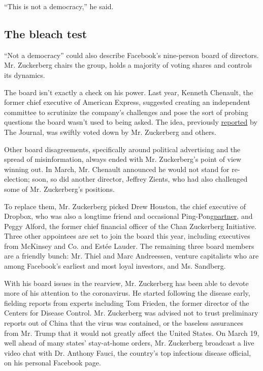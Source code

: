 ``This is not a democracy,'' he said.

\hypertarget{the-bleach-test}{%
\subsection{The bleach test}\label{the-bleach-test}}

``Not a democracy'' could also describe Facebook's nine-person board of
directors. Mr. Zuckerberg chairs the group, holds a majority of voting
shares and controls its dynamics.

The board isn't exactly a check on his power. Last year, Kenneth
Chenault, the former chief executive of American Express, suggested
creating an independent committee to scrutinize the company's challenges
and pose the sort of probing questions the board wasn't used to being
asked. The idea, previously
\href{https://www.wsj.com/articles/mark-zuckerberg-asserts-control-of-facebook-pushing-aside-dissenters-11588106984}{reported}
by The Journal, was swiftly voted down by Mr. Zuckerberg and others.

Other board disagreements, specifically around political advertising and
the spread of misinformation, always ended with Mr. Zuckerberg's point
of view winning out. In March, Mr. Chenault announced he would not stand
for re-election; soon, so did another director, Jeffrey Zients, who had
also challenged some of Mr. Zuckerberg's positions.

To replace them, Mr. Zuckerberg picked Drew Houston, the chief executive
of Dropbox, who was also a longtime friend and occasional
Ping-Pong\href{https://www.usatoday.com/story/tech/talkingtech/2017/03/09/ping-pong-night-out-tech-ceos-zuckerberg-houston-and-kalanick/98985578/}{partner},
and Peggy Alford, the former chief financial officer of the Chan
Zuckerberg Initiative. Three other appointees are set to join the board
this year, including executives from McKinsey and Co. and Estée Lauder.
The remaining three board members are a friendly bunch: Mr. Thiel and
Marc Andreessen, venture capitalists who are among Facebook's earliest
and most loyal investors, and Ms. Sandberg.

With his board issues in the rearview, Mr. Zuckerberg has been able to
devote more of his attention to the coronavirus. He started following
the disease early, fielding reports from experts including Tom Frieden,
the former director of the Centers for Disease Control. Mr. Zuckerberg
was advised not to trust preliminary reports out of China that the virus
was contained, or the baseless assurances from Mr. Trump that it would
not greatly affect the United States. On March 19, well ahead of many
states' stay-at-home orders, Mr. Zuckerberg broadcast a live video chat
with Dr. Anthony Fauci, the country's top infectious disease official,
on his personal Facebook page.

